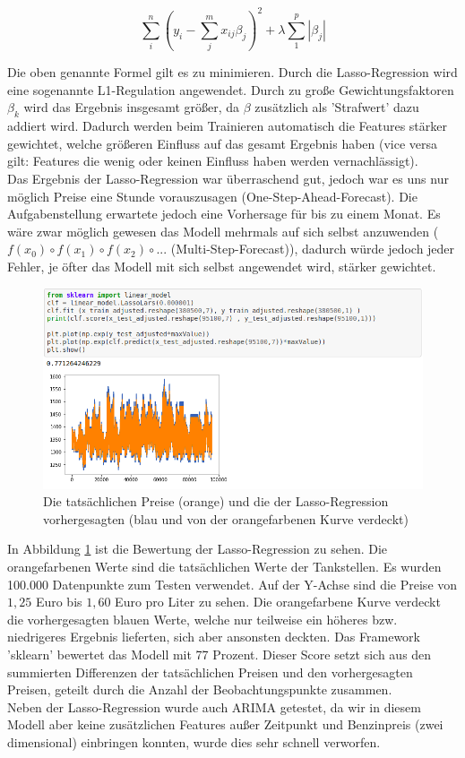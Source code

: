 \documentclass[
ngerman          %
,a4paper          %
,11pt
,pdftex
]{report}
\begin{document}
$$ \sum_{i}^{n}(y_i - \sum_{j}^{m} x_{ij}\beta_j)^2 + \lambda \sum_{1}^{p} |\beta_j| $$

Die oben genannte Formel gilt es zu minimieren.
Durch die Lasso-Regression wird eine sogenannte L1-Regulation angewendet. Durch zu große Gewichtungsfaktoren $\beta_k$ wird das Ergebnis insgesamt größer, da $\beta$ zusätzlich als 'Strafwert' dazu addiert wird. Dadurch werden beim Trainieren automatisch die Features stärker gewichtet, welche größeren Einfluss auf das gesamt Ergebnis haben (vice versa gilt: Features die wenig oder keinen Einfluss haben werden vernachlässigt).\\
Das Ergebnis der Lasso-Regression war überraschend gut, jedoch war es uns nur möglich Preise eine Stunde vorauszusagen (One-Step-Ahead-Forecast). Die Aufgabenstellung erwartete jedoch eine Vorhersage für bis zu einem Monat. Es wäre zwar möglich gewesen das Modell mehrmals auf sich selbst anzuwenden ( $f(x_0) \circ f(x_1) \circ f(x_2) \circ ... $ (Multi-Step-Forecast)), dadurch würde jedoch jeder Fehler, je öfter das Modell mit sich selbst angewendet wird, stärker gewichtet.\\
\begin{figure}
	\centering
	\includegraphics[width=0.7\linewidth]{images/fehlversuch}
	\caption{Die tatsächlichen Preise (orange) und die der Lasso-Regression vorhergesagten (blau und von der orangefarbenen Kurve verdeckt)}
	\label{fig:fehlversuch}
\end{figure}
In Abbildung \ref{fig:fehlversuch} ist die Bewertung der Lasso-Regression zu sehen. Die orangefarbenen Werte sind die tatsächlichen Werte der Tankstellen. Es wurden 100.000 Datenpunkte zum Testen verwendet. Auf der Y-Achse sind die Preise von $1,25$ Euro bis $1,60$ Euro pro Liter zu sehen. Die orangefarbene Kurve verdeckt die vorhergesagten blauen Werte, welche nur teilweise ein höheres bzw. niedrigeres Ergebnis lieferten, sich aber ansonsten deckten. Das Framework 'sklearn' bewertet das Modell mit 77 Prozent.
Dieser Score setzt sich aus den summierten Differenzen der tatsächlichen Preisen und den vorhergesagten Preisen, geteilt durch die Anzahl der Beobachtungspunkte zusammen.\\
Neben der Lasso-Regression wurde auch ARIMA getestet, da wir in diesem Modell aber keine zusätzlichen Features außer Zeitpunkt und Benzinpreis (zwei dimensional) einbringen konnten, wurde dies sehr schnell verworfen.
\end{document}
